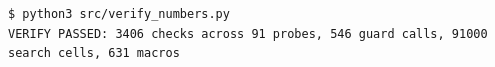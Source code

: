 \begin{lstlisting}
$ python3 src/verify_numbers.py
VERIFY PASSED: 3406 checks across 91 probes, 546 guard calls, 91000 search cells, 631 macros
\end{lstlisting}
